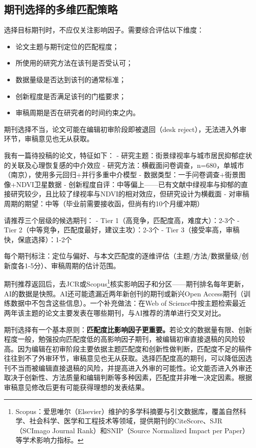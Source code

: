 \subsection{期刊选择的多维匹配策略}

选择目标期刊时，不应仅关注影响因子。需要综合评估以下维度：

\begin{itemize}[nosep]
\item 论文主题与期刊定位的匹配程度；
\item 所使用的研究方法在该刊是否受认可；
\item 数据量级是否达到该刊的通常标准；
\item 创新程度是否满足该刊的门槛要求；
\item 审稿周期是否在研究者的时间约束之内。
\end{itemize}

期刊选择不当，论文可能在编辑初审阶段即被退回（desk reject），无法进入外审环节，审稿意见也无从获取。

\begin{userbox}
我有一篇待投稿的论文，特征如下：
- 研究主题：街景绿视率与城市居民抑郁症状的关联及心理恢复感的中介效应
- 研究方法：横截面问卷调查，n=680，单城市（南京），使用多元回归+并行多重中介模型
- 数据类型：一手问卷调查+街景图像+NDVI卫星数据
- 创新程度自评：中等偏上——已有文献中绿视率与抑郁的直接研究较少，且比较了绿视率与NDVI的相对效应，但研究设计为横截面
- 对审稿周期的期望：中等（毕业前需要接收函，但尚有约10个月缓冲期）

请推荐三个层级的候选期刊：
- Tier 1（高竞争，匹配度高，难度大）：2-3个
- Tier 2（中等竞争，匹配度最好，建议主攻）：2-3个
- Tier 3（接受率高，审稿快，保底选择）：1-2个

每个期刊标注：定位与偏好、与本文匹配度的逐维评估（主题/方法/数据量级/创新度各1-5分）、审稿周期的估计范围。
\end{userbox}

期刊推荐返回后，去JCR或Scopus\footnote{Scopus：爱思唯尔（Elsevier）维护的多学科摘要与引文数据库，覆盖自然科学、社会科学、医学和工程技术等领域，提供期刊的CiteScore、SJR（SCImago Journal Rank）和SNIP（Source Normalized Impact per Paper）等学术影响力指标。}核实影响因子和分区——期刊排名每年更新，AI的数据是快照。AI还可能遗漏近两年新创刊的期刊或新兴Open Access期刊（训练数据中不包含这些信息）。一个补充做法：在Web of Science中按主题检索最近两年该主题的论文主要发表在哪些期刊，与AI推荐的清单进行交叉对比。

期刊选择有一个基本原则：\textbf{匹配度比影响因子更重要。}若论文的数据量有限、创新程度一般，勉强投向匹配度低的高影响因子期刊，被编辑初审直接退稿的风险较高。因为编辑在初审阶段主要依据主题匹配度和创新性做判断，匹配度不足的稿件往往到不了外审环节，审稿意见也无从获取。选择匹配度高的期刊，可以降低因选刊不当而被编辑直接退稿的风险，并提高进入外审的可能性。论文能否进入外审还取决于创新性、方法质量和编辑判断等多种因素，匹配度并非唯一决定因素。根据审稿意见修改后更有可能获得理想的发表结果。


